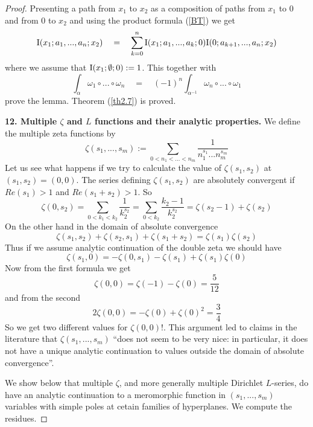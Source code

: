 \documentclass[10pt]{article}
\begin{document}
\vskip 3mm \noindent
\begin{proof} 
Presenting a path from $x_1$ to $x_2$ as a composition of paths from $x_1$ to $0$ and from $0$ to $x_2$ and using the product formula (\ref{BT}) we get 
\begin{equation} \label{2$}
{\rm I}(x_1;a_{1},...,a_n;x_2) \quad= \quad  \sum_{k=0}^{n} {\rm I}(x_1; a_{1},...,a_k;0)   
{\rm I}(0;a_{k+1},...,a_n;x_2) 
\end{equation} 
where we assume that ${\rm I}(x_1; \emptyset ;0) := 1$. This together with 
\begin{equation} \label{QN1}
\int_{\alpha} \omega_1 \circ ... \circ  \omega_n \quad = \quad(-1)^n\int_{\alpha^{-1}} \omega_n \circ ... \circ  \omega_1
\end{equation}
prove the lemma. 
Theorem (\ref{th2.7}) is proved.

 
{ \bf 12. Multiple $\zeta$ and $L$ functions and their analytic properties. }
We define the multiple zeta functions by 
$$%
\zeta(s_1,...,s_m):= \sum_{0< n_1 < ... < n_m}\frac{1}{n_1^{s_1} ...  n_m^{s_m}}
$$%
Let us
see what happens if we try to calculate the value
of $\zeta(s_1,s_2)$ at $(s_1,s_2)=(0,0)$. The series defining $\zeta(s_1,s_2)$
are absolutely convergent if $Re (s_1) >1$ and $ Re (s_1+s_2)
>1$. So
$$
\zeta( 0 ,s_2) =  \sum_{0 < k_1 < k_2} \frac{1}{k_2^{s_2}} =
\sum_{0  < k_2} \frac{k_2-1}{k_2^{s_2}} = \zeta( s_2-1) + \zeta( s_2)
$$
On the other hand in the domain of absolute convergence
$$
\zeta(s_1,s_2) + \zeta(s_2,s_1) + \zeta(s_1+s_2)= \zeta(s_1) \zeta(s_2) 
$$
Thus if we assume analytic continuation of the double zeta we
should have
$$
\zeta(s_1,0)= -\zeta(0,s_1) - \zeta(s_1) + \zeta(s_1) \zeta(0)
$$
Now from the first formula we get
$$
\zeta(0,0) = \zeta(-1) - \zeta(0) = \frac{5}{12}
$$
and from the second
$$
2\zeta(0,0) = - \zeta(0) + \zeta(0)^2 = \frac{3}{4}
$$
So we get two different values for $\zeta(0,0)$!.
This argument led to claims in the literature  that 
 $\zeta(s_1,...,s_m)$ ``does not seem to be very nice: in
 particular, it does not have a unique analytic continuation to
 values outside the domain of absolute convergence''.

We show below that multiple $\zeta$, and more
generally multiple Dirichlet $L$-series, do have an analytic
continuation to a meromorphic function in  $(s_1,...,s_m)$
variables with simple 
poles at cetain families of hyperplanes. We compute the residues.


\end{proof}
\end{document}
